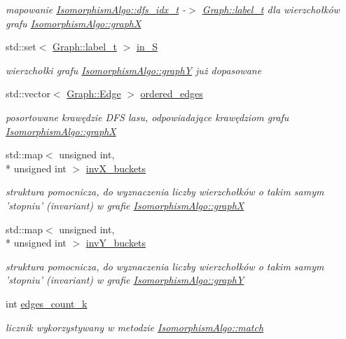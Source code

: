 \begin{DoxyCompactItemize}
\begin{DoxyCompactList}\small\item\em mapowanie \hyperlink{classIsomorphismAlgo_ab4ec6489271a99fae3bd2476b22ef35b}{Isomorphism\-Algo\-::dfs\-\_\-idx\-\_\-t} -\/$>$ \hyperlink{classGraph_a2237a0ada8484c37b8200c0e3685ca71}{Graph\-::label\-\_\-t} dla wierzchołków grafu \hyperlink{classIsomorphismAlgo_a78bc7264b0a6a264b0343209b3ca3647}{Isomorphism\-Algo\-::graph\-X} \end{DoxyCompactList}\item 
std\-::set$<$ \hyperlink{classGraph_a2237a0ada8484c37b8200c0e3685ca71}{Graph\-::label\-\_\-t} $>$ \hyperlink{classIsomorphismAlgo_aad800e9783285450edbcdcb3b65c4133}{in\-\_\-\-S}
\begin{DoxyCompactList}\small\item\em wierzchołki grafu \hyperlink{classIsomorphismAlgo_a7656ae201d816e62edda60462cdb3a6e}{Isomorphism\-Algo\-::graph\-Y} już dopasowane \end{DoxyCompactList}\item 
std\-::vector$<$ \hyperlink{structGraph_1_1Edge}{Graph\-::\-Edge} $>$ \hyperlink{classIsomorphismAlgo_a0763ab4b07232f8aa9ca80561f353ad1}{ordered\-\_\-edges}
\begin{DoxyCompactList}\small\item\em posortowane krawędzie D\-F\-S lasu, odpowiadające krawędziom grafu \hyperlink{classIsomorphismAlgo_a78bc7264b0a6a264b0343209b3ca3647}{Isomorphism\-Algo\-::graph\-X} \end{DoxyCompactList}\item 
std\-::map$<$ unsigned int, \\*
unsigned int $>$ \hyperlink{classIsomorphismAlgo_a3cf2ede3f4668ecb3ea8a005e190c9f4}{inv\-X\-\_\-buckets}
\begin{DoxyCompactList}\small\item\em struktura pomocnicza, do wyznaczenia liczby wierzchołków o takim samym 'stopniu' (invariant) w grafie \hyperlink{classIsomorphismAlgo_a78bc7264b0a6a264b0343209b3ca3647}{Isomorphism\-Algo\-::graph\-X} \end{DoxyCompactList}\item 
std\-::map$<$ unsigned int, \\*
unsigned int $>$ \hyperlink{classIsomorphismAlgo_a8dcd9224b6360d3e5776307d8680f975}{inv\-Y\-\_\-buckets}
\begin{DoxyCompactList}\small\item\em struktura pomocnicza, do wyznaczenia liczby wierzchołków o takim samym 'stopniu' (invariant) w grafie \hyperlink{classIsomorphismAlgo_a7656ae201d816e62edda60462cdb3a6e}{Isomorphism\-Algo\-::graph\-Y} \end{DoxyCompactList}\item 
int \hyperlink{classIsomorphismAlgo_af185ab17b845defe14c0998c173e70ae}{edges\-\_\-count\-\_\-k}
\begin{DoxyCompactList}\small\item\em licznik wykorzystywany w metodzie \hyperlink{classIsomorphismAlgo_aa10814d9f3fe70fde74ec4f6aadb6273}{Isomorphism\-Algo\-::match} \end{DoxyCompactList}\end{DoxyCompactItemize}


